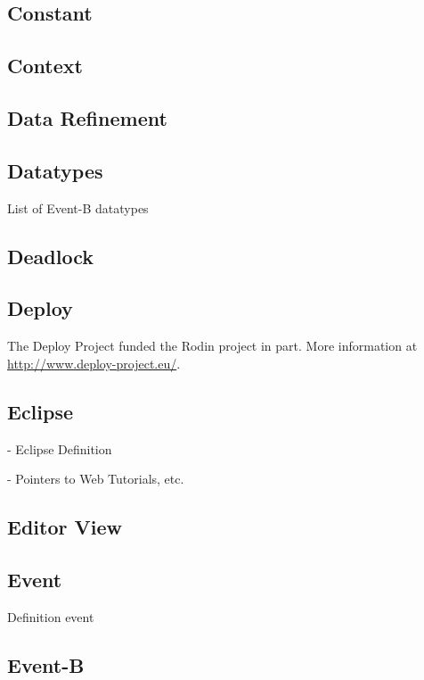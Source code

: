 \subsection{Constant}
\label{constant}

\subsection{Context}
\label{context}

\subsection{Data Refinement}
\label{data_refinement}

\subsection{Datatypes}
\label{datatypes}

List of Event-B datatypes

\subsection{Deadlock}
\label{deadlock}

\subsection{Deploy}
\label{deploy}

The Deploy Project funded the Rodin project in part.  More information at \url{http://www.deploy-project.eu/}.

\subsection{Eclipse}
\label{eclipse}

- Eclipse Definition

- Pointers to Web Tutorials, etc.

\subsection{Editor View}
\label{editor_view}


\subsection{Event}
\label{event}

Definition event

\subsection{Event-B}
\label{eventb}

